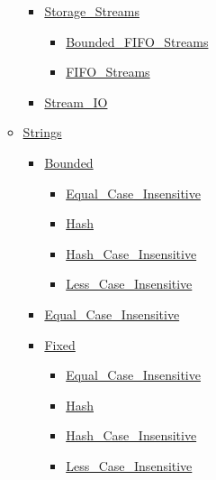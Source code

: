\documentclass[english]{article}
\begin{document}
\begin{scriptsize}
\begin{multicols*}{5}
\begin{itemize}[leftmargin=0mm]
\begin{itemize}[leftmargin=5mm]
	\begin{itemize}[leftmargin=5mm]
	\item[] \href{http://www.ada-auth.org/standards/22rm/html/RM-13-13-1.html}{Storage\_Streams}
	  \begin{itemize}[leftmargin=5mm]
	  \item[] \href{http://www.ada-auth.org/standards/22rm/html/RM-13-13-1.html}{Bounded\_FIFO\_Streams}
	  \item[] \href{http://www.ada-auth.org/standards/22rm/html/RM-13-13-1.html}{FIFO\_Streams}
	  \end{itemize}
	\item[] \href{http://www.ada-auth.org/standards/22rm/html/RM-A-12-1.html}{Stream\_IO}
	\end{itemize}
  \item[] \href{http://www.ada-auth.org/standards/22rm/html/RM-A-4-1.html}{Strings}
	\begin{itemize}[leftmargin=5mm]
	\item[] \href{http://www.ada-auth.org/standards/22rm/html/RM-A-4-4.html}{Bounded}
	  \begin{itemize}[leftmargin=5mm]
	  \item[] \href{http://www.ada-auth.org/standards/22rm/html/RM-A-4-10.html}{Equal\_Case\_Insensitive}
	  \item[] \href{http://www.ada-auth.org/standards/22rm/html/RM-A-4-9.html}{Hash}
	  \item[] \href{http://www.ada-auth.org/standards/22rm/html/RM-A-4-9.html}{Hash\_Case\_Insensitive}
	  \item[] \href{http://www.ada-auth.org/standards/22rm/html/RM-A-4-10.html}{Less\_Case\_Insensitive}
	  \end{itemize}
	\item[] \href{http://www.ada-auth.org/standards/22rm/html/RM-A-4-10.html}{Equal\_Case\_Insensitive}
	\item[] \href{http://www.ada-auth.org/standards/22rm/html/RM-A-4-3.html}{Fixed}
	  \begin{itemize}[leftmargin=5mm]
	  \item[] \href{http://www.ada-auth.org/standards/22rm/html/RM-A-4-10.html}{Equal\_Case\_Insensitive}
	  \item[] \href{http://www.ada-auth.org/standards/22rm/html/RM-A-4-9.html}{Hash}
	  \item[] \href{http://www.ada-auth.org/standards/22rm/html/RM-A-4-9.html}{Hash\_Case\_Insensitive}
	  \item[] \href{http://www.ada-auth.org/standards/22rm/html/RM-A-4-10.html}{Less\_Case\_Insensitive}

\end{itemize}
\end{itemize}
\end{itemize}
\end{itemize}
\end{multicols*}
\end{scriptsize}
\end{document}
